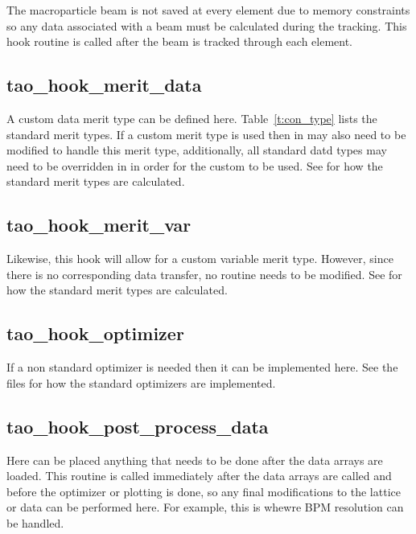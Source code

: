 The macroparticle beam is not saved at every element due to memory constraints
so any data associated with a beam must be calculated during the tracking. This
hook routine is called after the beam is tracked through each element.

\subsection{tao\_hook\_merit\_data}

A custom data merit type can be defined here. Table~\ref{t:con_type} lists the
standard merit types. If a custom merit type is used then  in
 may also need to be modified to handle this merit
type, additionally, all standard datd types may need to be overridden in 
 in order for the custom  to be used.
See  for how the standard merit types are calculated.

\subsection{tao\_hook\_merit\_var}

Likewise, this hook will allow for a custom variable merit type. However, since
there is no corresponding data transfer, no  routine needs to be modified.
See  for how the standard merit types are calculated.

\subsection{tao\_hook\_optimizer}

If a non standard optimizer is needed then it can be implemented here. See the
 files for how the standard optimizers are
implemented.

\subsection{tao\_hook\_post\_process\_data}

Here can be placed anything that needs to be done after the data arrays are
loaded. This routine is called immediately after the data arrays are called and
before the optimizer or plotting is done, so any final modifications to the
lattice or data can be performed here. For example, this is whewre BPM
resolution can be handled.

